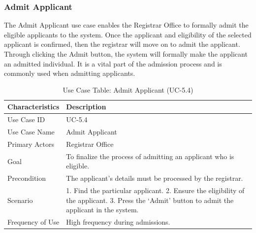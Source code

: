 \subsubsection{Admit Applicant}
The Admit Applicant use case enables the Registrar Office to formally admit the eligible applicants to the system. Once the applicant and eligibility of the selected applicant is confirmed, then the registrar will move on to admit the applicant. Through clicking the Admit button, the system will formally make the applicant an admitted individual. It is a vital part of the admission process and is commonly used when admitting applicants.
\begin{table}[H]
    \centering
    \small
    \renewcommand{\arraystretch}{1.4}
    \caption{Use Case Table: Admit Applicant (UC-5.4)} %
    \label{tab:admit-applicant-registrar}
    \begin{tabularx}{\textwidth}{|l|X|}
        \hline
        \rowcolor[gray]{0.9} {Characteristics} & {Description} \\ \hline
        Use Case ID & UC-5.4 \\ \hline
        Use Case Name & Admit Applicant \\ \hline
        Primary Actors & Registrar Office \\ \hline
        Goal & To finalize the process of admitting an applicant who is eligible. \\ \hline
        Precondition & The applicant’s details must be processed by the registrar. \\ \hline
        Scenario & 1. Find the particular applicant. 2. Ensure the eligibility of the applicant. 3. Press the ‘Admit’ button to admit the applicant in the system. \\ \hline
        Frequency of Use & High frequency during admissions. \\ \hline
    \end{tabularx}
\end{table}
\FloatBarrier